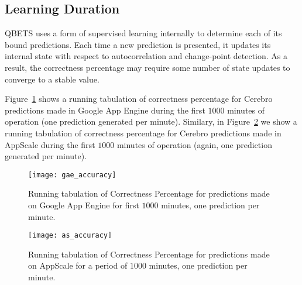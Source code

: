 \subsection{Learning Duration}

QBETS uses a form of supervised learning internally to determine each of its
bound predictions.  Each time a new prediction is presented, it updates its
internal state with respect to autocorrelation and change-point detection.  As
a result, the correctness percentage may require some number of state updates
to converge to a stable value.


Figure~\ref{fig:gae_accuracy} shows a running tabulation of
correctness percentage for Cerebro
predictions made in Google App Engine during the first 
$1000$ minutes of operation (one prediction generated per minute). 
Similary, in Figure~\ref{fig:as_accuracy} we show a running tabulation of
correctness percentage for Cerebro
predictions made in AppScale during the first 
$1000$ minutes of operation (again, one prediction generated per minute). 

\begin{figure}
\centering
\texttt{[image: gae\_accuracy]}
\caption{Running tabulation of Correctness Percentage for predictions made on Google App 
Engine for first $1000$ minutes, one prediction per minute.}
\label{fig:gae_accuracy}
\end{figure}

\begin{figure}
\centering
\texttt{[image: as\_accuracy]}
\caption{Running tabulation of Correctness Percentage for predictions made on AppScale for a period
of $1000$ minutes, one prediction per minute.}
\label{fig:as_accuracy}
\end{figure}

